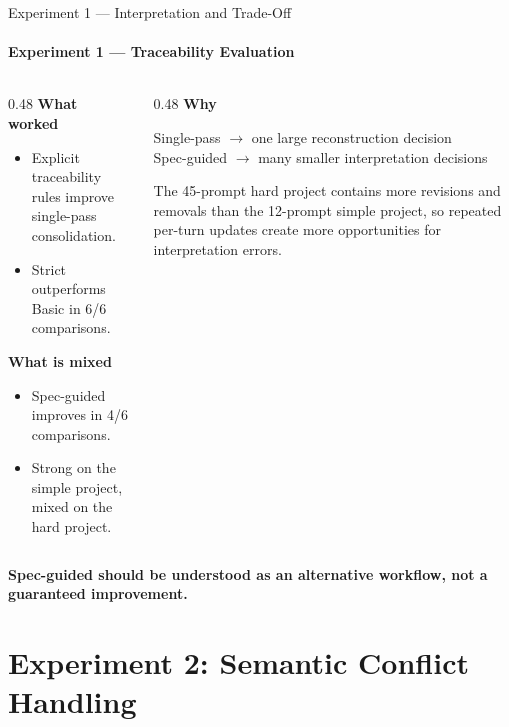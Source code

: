 \documentclass[aspectratio=169,11pt,c]{beamer}
\newcommand{\takeaway}[1]{\begin{center}{\bfseries\color{accentorange}\large #1}\end{center}}
\begin{document}
\begin{frame}{Experiment 1 --- Interpretation and Trade-Off}
  \framesubtitle{Experiment 1 --- Traceability Evaluation}
  \begin{columns}[T]
    \begin{column}{0.48\textwidth}
      {\footnotesize\bfseries\color{primaryblue}What worked}
      \begin{itemize}\scriptsize
        \item Explicit traceability rules improve single-pass consolidation.
        \item Strict outperforms Basic in 6/6 comparisons.
      \end{itemize}
      \vspace{4pt}
      {\footnotesize\bfseries\color{accentorange}What is mixed}
      \begin{itemize}\scriptsize
        \item Spec-guided improves in 4/6 comparisons.
        \item Strong on the simple project, mixed on the hard project.
      \end{itemize}
    \end{column}
    \begin{column}{0.48\textwidth}
      {\footnotesize\bfseries\color{inkgray}Why}
      \begin{center}\scriptsize
      Single-pass $\to$ one large reconstruction decision\\[4pt]
      Spec-guided $\to$ many smaller interpretation decisions
      \end{center}
      \vspace{5pt}
      {\footnotesize\color{midgray}The 45-prompt hard project contains more revisions and removals than the 12-prompt simple project, so repeated per-turn updates create more opportunities for interpretation errors.\par}
    \end{column}
  \end{columns}
  \vspace{5pt}
  \takeaway{Spec-guided should be understood as an alternative workflow, not a guaranteed improvement.}
\end{frame}

\section{Experiment 2: Semantic Conflict Handling}
\end{document}
